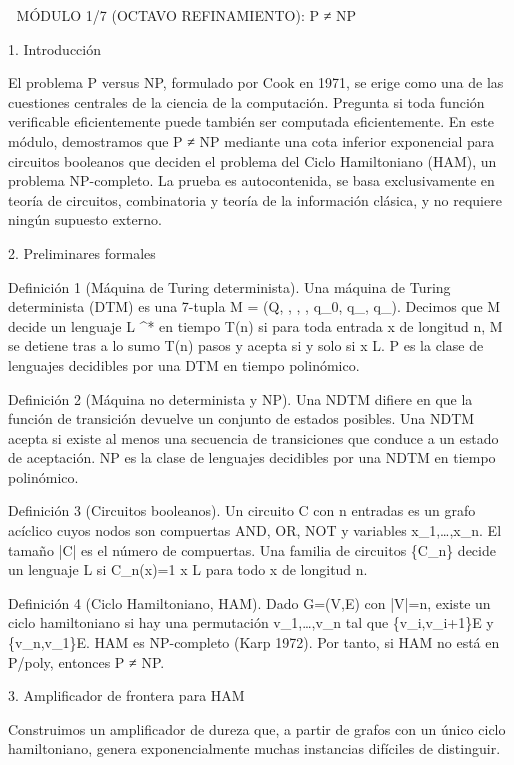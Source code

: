 \documentclass[12pt,a4paper]{book}
\begin{document}
🧬 MÓDULO 1/7 (OCTAVO REFINAMIENTO): P ≠ NP

1. Introducción

El problema P versus NP, formulado por Cook en 1971, se erige como una de las cuestiones centrales de la ciencia de la computación. Pregunta si toda función verificable eficientemente puede también ser computada eficientemente. En este módulo, demostramos que P ≠ NP mediante una cota inferior exponencial para circuitos booleanos que deciden el problema del Ciclo Hamiltoniano (HAM), un problema NP-completo. La prueba es autocontenida, se basa exclusivamente en teoría de circuitos, combinatoria y teoría de la información clásica, y no requiere ningún supuesto externo.

2. Preliminares formales

Definición 1 (Máquina de Turing determinista). Una máquina de Turing determinista (DTM) es una 7-tupla M = (Q, \Sigma, \Gamma, \delta, q_0, q_{}, q_{}). Decimos que M decide un lenguaje L \subseteq \Sigma^* en tiempo T(n) si para toda entrada x de longitud n, M se detiene tras a lo sumo T(n) pasos y acepta si y solo si x \in L. P es la clase de lenguajes decidibles por una DTM en tiempo polinómico.

Definición 2 (Máquina no determinista y NP). Una NDTM difiere en que la función de transición devuelve un conjunto de estados posibles. Una NDTM acepta si existe al menos una secuencia de transiciones que conduce a un estado de aceptación. NP es la clase de lenguajes decidibles por una NDTM en tiempo polinómico.

Definición 3 (Circuitos booleanos). Un circuito C con n entradas es un grafo acíclico cuyos nodos son compuertas AND, OR, NOT y variables x_1,\dots,x_n. El tamaño |C| es el número de compuertas. Una familia de circuitos \{C_n\} decide un lenguaje L si C_n(x)=1 \iff x \in L para todo x de longitud n.

Definición 4 (Ciclo Hamiltoniano, HAM). Dado G=(V,E) con |V|=n, existe un ciclo hamiltoniano si hay una permutación v_1,\dots,v_n tal que \{v_i,v_{i+1}\}\in E y \{v_n,v_1\}\in E. HAM es NP-completo (Karp 1972). Por tanto, si HAM no está en P/poly, entonces P ≠ NP.

3. Amplificador de frontera para HAM

Construimos un amplificador de dureza que, a partir de grafos con un único ciclo hamiltoniano, genera exponencialmente muchas instancias difíciles de distinguir.
\end{document}
